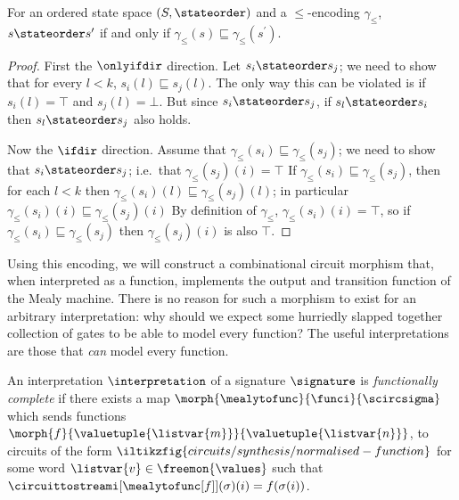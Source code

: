 \begin{lemma}
    For an ordered state space \((S,\stateorder)\) and a \(\leq\)-encoding
    \(\gamma_\leq\), \(s \stateorder s^\prime\) if and only if
    \(\gamma_\leq(s) \sqsubseteq \gamma_\leq(s^\prime)\).
\end{lemma}
\begin{proof}
    First the \(\onlyifdir\) direction.
    Let \(s_i \stateorder s_j\); we need to show that for every \(l < k\),
    \(s_i(l) \sqsubseteq s_j(l)\).
    The only way this can be violated is if \(s_i(l) = \top\) and
    \(s_j(l) = \bot\).
    But since \(s_i \stateorder s_j\), if \(s_l \stateorder s_i\) then
    \(s_l \stateorder s_j\) also holds.

    Now the \(\ifdir\) direction.
    Assume that \(\gamma_\leq(s_i) \sqsubseteq \gamma_\leq(s_j)\); we need to
    show that \(s_i \stateorder s_j\); i.e.\ that \(\gamma_\leq(s_j)(i) = \top\)
    If \(\gamma_\leq(s_i) \sqsubseteq \gamma_\leq(s_j)\), then for each
    \(l < k\) then \(\gamma_\leq(s_i)(l) \sqsubseteq \gamma_\leq(s_j)(l)\);
    in particular \(\gamma_\leq(s_i)(i) \sqsubseteq \gamma_\leq(s_j)(i)\)
    By definition of \(\gamma_\leq\), \(\gamma_\leq(s_i)(i) = \top\), so if
    \(\gamma_\leq(s_i) \sqsubseteq \gamma_\leq(s_j)\) then
    \(\gamma_\leq(s_j)(i)\) is also \(\top\).
\end{proof}

Using this encoding, we will construct a combinational circuit morphism that,
when interpreted as a function, implements the output and transition function
of the Mealy machine.
There is no reason for such a morphism to exist for an arbitrary interpretation:
why should we expect some hurriedly slapped together collection of gates to be
able to model every function?
The useful interpretations are those that \emph{can} model every function.

\begin{definition}
    An interpretation \(\interpretation\) of a signature \(\signature\) is
    \emph{functionally complete} if there exists a map \(
        \morph{\mealytofunc}{\funci}{\scircsigma}
    \) which sends functions \(
        \morph{f}{\valuetuple{\listvar{m}}}{\valuetuple{\listvar{n}}}
    \), to circuits of the form \(
        \iltikzfig{circuits/synthesis/normalised-function}
    \) for some word \(\listvar{v} \in \freemon{\values}\) such that
    \(\circuittostreami[\mealytofunc[f]](\sigma)(i) = f(\sigma(i))\).
\end{definition}

